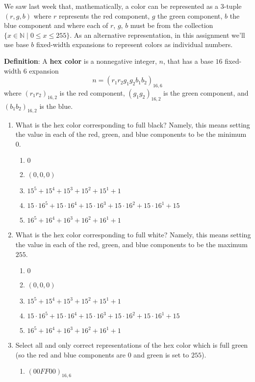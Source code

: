 \documentclass[12pt, oneside]{article}
\begin{document}
\begin{enumerate}
{We saw last week that, mathematically, a color can be represented as a $3$-tuple $(r, g, b)$ 
where $r$ represents the red component, $g$ the green component, $b$ the blue component and where each of $r$, $g$, $b$ must be from the collection $\{x \in \mathbb{N}\mid 0 \leq x \leq 255 \}$.
As an alternative representation, in this assignment
we'll use base $b$ fixed-width expansions to represent colors
as individual numbers.

{\bf Definition}: A {\bf hex color} is a nonnegative
integer, $n$, that has a base $16$ fixed-width $6$  expansion
$$n = (r_1r_2g_1g_2b_1b_2)_{16,6}$$ 
where $(r_1r_2)_{16,2}$ is the red
component, $(g_1g_2)_{16,2}$ is the green component, 
and $(b_1b_2)_{16,2}$ is the
blue. 
\begin{enumerate}
\item What is the hex color corresponding to full black? Namely, this means setting the value in each of the 
    red, green, and blue components to be the minimum $0$.
    \begin{enumerate}
    \item[] $0$
    \item[] $(0,0,0)$
    \item[] $15^{5}+15^4+15^3+15^2+15^1+1$
    \item[] $15\cdot 16^{5}+15\cdot 16^4+15\cdot 16^3+15 \cdot 16^2+15 \cdot 16^1+15$
    \item[] $16^{5}+16^4+16^3+16^2+16^1+1$
    \end{enumerate}
\item What is the hex color corresponding to full white? Namely, this means setting the value in each of the 
red, green, and blue components to be the maximum $255$.
    \begin{enumerate}
    \item[] $0$
    \item[] $(0,0,0)$
    \item[] $15^{5}+15^4+15^3+15^2+15^1+1$
    \item[] $15\cdot 16^{5}+15\cdot 16^4+15\cdot 16^3+15 \cdot 16^2+15 \cdot 16^1+15$
    \item[] $16^{5}+16^4+16^3+16^2+16^1+1$
    \end{enumerate}
\item Select all and only  correct representations of the hex color which is 
full green (so the red and blue components are $0$ and green is set to $255$).
\begin{enumerate}
    \item[] $(00FF00)_{16,6}$

\end{enumerate}
\end{enumerate}}
\end{enumerate}
\end{document}
